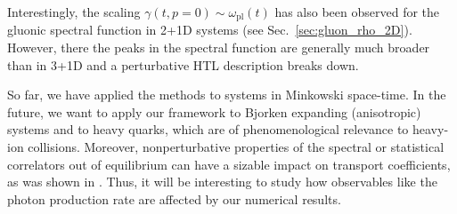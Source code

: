\documentclass[]{webofc}
\newcommand{\mrm}{\mathrm}
\newcommand{\wplas}{\omega_{\mrm{pl}}}
\newcommand{\se}{Sec.~}
\begin{document}
Interestingly, the scaling $\gamma(t,p{=}0) \sim \wplas(t)$ has also been observed for the gluonic spectral function in 2+1D systems (see \se\ref{sec:gluon_rho_2D}). 
However, there the peaks in the spectral function are generally much broader than in 3+1D and a perturbative HTL description breaks down. 

So far, we have applied the methods to systems in Minkowski space-time. In the future, we want to apply our framework to Bjorken expanding (anisotropic) systems and to heavy quarks, which are of phenomenological relevance to heavy-ion collisions. Moreover, nonperturbative properties of the spectral or statistical correlators out of equilibrium can have a sizable impact on transport coefficients, as was shown in \cite{Boguslavski:2020tqz}. Thus, it will be interesting to study how observables like the photon production rate are affected by our numerical results.




\begin{comment}
\section*{Acknowledgments}
  The authors are grateful to A.~Kurkela, M.~Mace and J.~Peuron for collaboration and discussions. 
  K.B.\ would like to acknowledge support by the Austrian Science Fund (FWF) under project P 34455-N. 
  T.L. is supported by the Academy of Finland, project 321840 and under the European Union’s Horizon 2020 research and innovation programme by the European Research Council (ERC, grant agreement No. ERC-2015-CoG-681707) and by the STRONG-2020 project (grant agreement No 824093). The content of this article does not reflect the official opinion of the European Union and responsibility for the information and views expressed therein lies entirely with the authors.
  The authors wish to acknowledge the National Energy Research Scientific Computing Center, a U.S. Department of Energy Office of Science User Facility supported under Contract No. DE-AC02-05CH11231, the CSC - IT Center for Science, Finland, and the Vienna Scientific Cluster (VSC, Austria) under the project number 71444 for computational resources. 

\end{comment}
\end{document}
